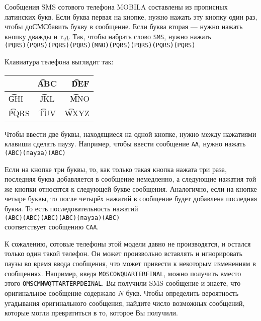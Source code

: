 Сообщения SMS сотового телефона MOBILA составлены из прописных латинских букв.
Если буква первая на кнопке, нужно нажать эту кнопку один раз,
чтобы доСМСбавить букву в сообщение. Если буква вторая --- нужно нажать кнопку дважды и т.д.
Так, чтобы набрать слово \texttt{SMS}, нужно нажать \\
\texttt{(PQRS)(PQRS)(PQRS)(PQRS)(MNO)(PQRS)(PQRS)(PQRS)(PQRS)}

Клавиатура телефона выглядит так:

\begin{tabular}{ | l | c | r | }
\hline
& \t{ABC} & \t{DEF} \\ \hline
\t{GHI} & \t{JKL} & \t{MNO} \\ \hline
\t{PQRS} & \t{TUV} & \t{WXYZ} \\ \hline
\end{tabular}

Чтобы ввести две буквы, находящиеся на одной кнопке,
нужно между нажатиями клавиши сделать паузу.
Например, чтобы ввести сообщение \texttt{AA}, нужно нажать \\
\texttt{(ABC)(пауза)(ABC)}

Если на кнопке три буквы, то, как только такая кнопка нажата три раза,
последняя буква добавляется в сообщение немедленно, а следующие нажатия
той же кнопки относятся к следующей букве сообщения. Аналогично,
если на кнопке четыре буквы, то после четырёх нажатий в сообщение
будет добавлена последняя буква. То есть последовательность нажатий \\
\texttt{(ABC)(ABC)(ABC)(ABC)(пауза)(ABC)} \\
соответствует сообщению \texttt{CAA}.

К сожалению, сотовые телефоны этой модели давно не производятся,
и остался только один такой телефон. Он может произвольно вставлять
и игнорировать паузы во время ввода сообщения, что может привести к
некоторым изменениям в сообщениях. Например, введя \texttt{MOSCOWQUARTERFINAL},
можно получить вместо этого \texttt{OMSCMNWQTTARTERPDEINAL}.
Вы получили SMS-сообщение и знаете, что оригинальное сообщение содержало $N$ букв. Чтобы определить вероятность угадывания оригинального сообщения, найдите число возможных сообщений, которые могли превратиться в то, которое Вы получили.
